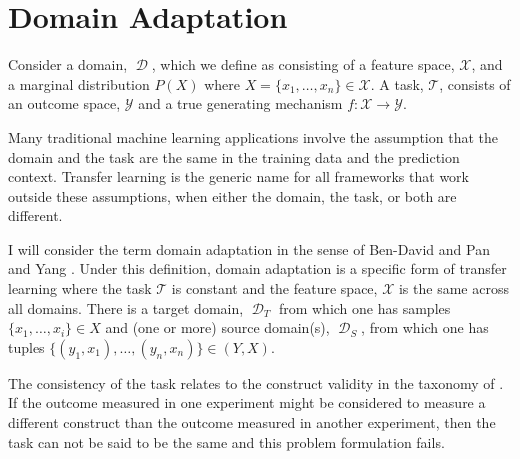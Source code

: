 \documentclass[a4paper,12pt]{article}
\DeclareMathOperator*{\D}{\mathcal{D}}
\begin{document}





\section{Domain Adaptation}

Consider a domain, $\D$, which we define as consisting of a feature space, $\mathcal{X}$, and a marginal distribution $P(X)$ where $X = \{x_1,\ldots,x_n\} \in \mathcal{X}$. A task, $\mathcal{T}$, consists of an outcome space, $\mathcal{Y}$ and a true generating mechanism $f: \mathcal{X} \rightarrow \mathcal{Y}$.

Many traditional machine learning applications involve the assumption that the domain and the task are the same in the training data and the prediction context. Transfer learning is the generic name for all frameworks that work outside these assumptions, when either the domain, the task, or both are different. 

I will consider the term domain adaptation in the sense of Ben-David \parencite*{Ben-David2006} and Pan and Yang \parencite*{Pan2010}. Under this definition, domain adaptation is a specific form of transfer learning where the task $\mathcal{T}$ is constant and the feature space, $\mathcal{X}$ is the same across all domains. There is a target domain, $\D_T$ from which one has samples $\{x_1,\ldots,x_i\} \in X$ and (one or more) source domain(s), $\D_S$, from which one has tuples $\{(y_1, x_1),\dots,(y_n, x_n)\} \in (Y, X)$. 

The consistency of the task relates to the construct validity in the taxonomy of \cite{Shadish2002}. If the outcome measured in one experiment might be considered to measure a different construct than the outcome measured in another experiment, then the task can not be said to be the same and this problem formulation fails. 
\end{document}
